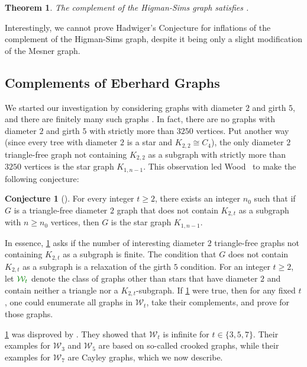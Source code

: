 \documentclass[11pt]{article}
\numberwithin{equation}{section}
\theoremstyle{plain}
\newtheorem{thm}[equation]{Theorem}
\theoremstyle{definition}
\newtheorem{conj}[thm]{Conjecture}
\renewcommand{\geq}{\geqslant}
\newcommand{\mathdefn}[1]{\textcolor{green!50!black}{#1}}
\begin{document}
\begin{thm}
    \label{thm:higman_sims}
    The complement of the Higman-Sims graph satisfies .
\end{thm}

Interestingly, we cannot prove Hadwiger's Conjecture for inflations of the complement of the Higman-Sims graph, despite it being only a slight modification of the Mesner graph.

\subsection{Complements of Eberhard Graphs}
\label{ss:eberhard}
We started our investigation by considering graphs with diameter $2$ and girth $5$, and there are finitely many such graphs \citep{HS60}. In fact, there are no graphs with diameter $2$ and girth $5$ with strictly more than $3250$ vertices.
Put another way (since every tree with diameter $2$ is a star and $K_{2,2} \cong C_4$), the only diameter $2$ triangle-free graph not containing $K_{2,2}$ as a subgraph with strictly more than $3250$ vertices is the star graph $K_{1, n-1}$.
This observation led Wood~\citep{devillers2024triangle} to make the following conjecture:

\begin{conj}[\citep{devillers2024triangle}]
    \label{conj:wood}
    For every integer $t \geq 2$, there exists an integer $n_0$ such that if $G$ is a triangle-free diameter $2$ graph that does not contain $K_{2,t}$ as a subgraph with $n \geq n_0$ vertices, then $G$ is the star graph $K_{1, n-1}$.
\end{conj}

In essence, \cref{conj:wood} asks if the number of interesting diameter $2$ triangle-free graphs not containing $K_{2,t}$ as a subgraph is finite. The condition that $G$ does not contain $K_{2,t}$ as a subgraph is a relaxation of the girth $5$ condition. For an integer $t \geq 2$, let $\mathdefn{\mathcal{W}_t}$ denote the class of graphs other than stars that have diameter $2$ and contain neither a triangle nor a $K_{2,t}$-subgraph.
If \cref{conj:wood} were true, then for any fixed $t$, one could enumerate all graphs in $\mathcal{W}_t$, take their complements, and prove  for those graphs.

\cref{conj:wood} was disproved by \citet{ETT25}. They showed that $\mathcal{W}_t$ is infinite for $t \in \{3,5,7\}$. Their examples for $\mathcal{W}_3$ and $\mathcal{W}_5$ are based on so-called crooked graphs, while their examples for $\mathcal{W}_7$ are Cayley graphs, which we now describe.
\end{document}
